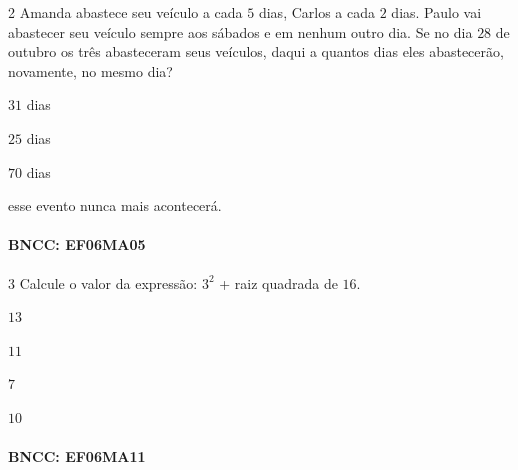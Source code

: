 {\num{2}  Amanda abastece seu veículo a cada $5$ dias, Carlos a cada $2$ dias.
Paulo vai abastecer seu veículo sempre aos sábados e em nenhum outro
dia. Se no dia $28$ de outubro os três abasteceram seus veículos, daqui a
quantos dias eles abastecerão, novamente, no mesmo dia?

\begin{escolha}
\item $31$ dias
\item $25$ dias
\item $70$ dias
\item esse evento nunca mais acontecerá.
\end{escolha}

\paragraph{BNCC: EF06MA05 }



\num{3} Calcule o valor da expressão: $3^2$ + raiz quadrada de $16$.

\begin{escolha}
\item $13$
\item $11$
\item $7$
\item $10$
\end{escolha}

\paragraph{BNCC: EF06MA11 }

}
